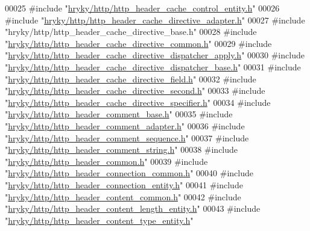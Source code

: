 \begin{DoxyCode}
00025 \textcolor{preprocessor}{#include "\hyperlink{http__header__cache__control__entity_8h}{hryky/http/http_header_cache_control_entity.h}"}
00026 \textcolor{preprocessor}{#include "\hyperlink{http__header__cache__directive__adapter_8h}{hryky/http/http_header_cache_directive_adapter.h}"}
00027 \textcolor{preprocessor}{#include "hryky/http/http\_header\_cache\_directive\_base.h"}
00028 \textcolor{preprocessor}{#include "\hyperlink{http__header__cache__directive__common_8h}{hryky/http/http_header_cache_directive_common.h}"}
00029 \textcolor{preprocessor}{#include "\hyperlink{http__header__cache__directive__dispatcher__apply_8h}{hryky/http/http_header_cache_directive_dispatcher_apply.h}"}
00030 \textcolor{preprocessor}{#include "\hyperlink{http__header__cache__directive__dispatcher__base_8h}{hryky/http/http_header_cache_directive_dispatcher_base.h}"}
00031 \textcolor{preprocessor}{#include "\hyperlink{http__header__cache__directive__field_8h}{hryky/http/http_header_cache_directive_field.h}"}
00032 \textcolor{preprocessor}{#include "\hyperlink{http__header__cache__directive__second_8h}{hryky/http/http_header_cache_directive_second.h}"}
00033 \textcolor{preprocessor}{#include "\hyperlink{http__header__cache__directive__specifier_8h}{hryky/http/http_header_cache_directive_specifier.h}"}
00034 \textcolor{preprocessor}{#include "\hyperlink{http__header__comment__base_8h}{hryky/http/http_header_comment_base.h}"}
00035 \textcolor{preprocessor}{#include "\hyperlink{http__header__comment__adapter_8h}{hryky/http/http_header_comment_adapter.h}"}
00036 \textcolor{preprocessor}{#include "\hyperlink{http__header__comment__sequence_8h}{hryky/http/http_header_comment_sequence.h}"}
00037 \textcolor{preprocessor}{#include "\hyperlink{http__header__comment__string_8h}{hryky/http/http_header_comment_string.h}"}
00038 \textcolor{preprocessor}{#include "\hyperlink{http__header__common_8h}{hryky/http/http_header_common.h}"}
00039 \textcolor{preprocessor}{#include "\hyperlink{http__header__connection__common_8h}{hryky/http/http_header_connection_common.h}"}
00040 \textcolor{preprocessor}{#include "\hyperlink{http__header__connection__entity_8h}{hryky/http/http_header_connection_entity.h}"}
00041 \textcolor{preprocessor}{#include "\hyperlink{http__header__content__common_8h}{hryky/http/http_header_content_common.h}"}
00042 \textcolor{preprocessor}{#include "\hyperlink{http__header__content__length__entity_8h}{hryky/http/http_header_content_length_entity.h}"}
00043 \textcolor{preprocessor}{#include "\hyperlink{http__header__content__type__entity_8h}{hryky/http/http_header_content_type_entity.h}"}

\end{DoxyCode}
